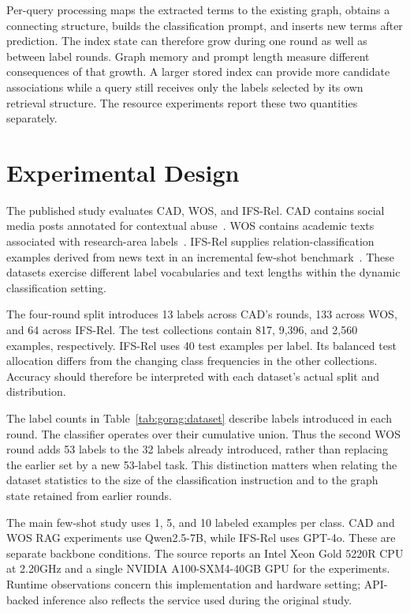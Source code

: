 Per-query processing maps the extracted terms to the existing graph, obtains a connecting structure, builds the classification prompt, and inserts new terms after prediction. The index state can therefore grow during one round as well as between label rounds. Graph memory and prompt length measure different consequences of that growth. A larger stored index can provide more candidate associations while a query still receives only the labels selected by its own retrieval structure. The resource experiments report these two quantities separately.

\section{Experimental Design}
\label{sec:gorag:experiments}

The published study evaluates CAD, WOS, and IFS-Rel. CAD contains social media posts annotated for contextual abuse~\cite{gorag-vidgen2021introducing}. WOS contains academic texts associated with research-area labels~\cite{gorag-kowsari2017hdltex}. IFS-Rel supplies relation-classification examples derived from news text in an incremental few-shot benchmark~\cite{gorag-xia-etal-2021-incremental}. These datasets exercise different label vocabularies and text lengths within the dynamic classification setting.

The four-round split introduces 13 labels across CAD's rounds, 133 across WOS, and 64 across IFS-Rel. The test collections contain 817, 9,396, and 2,560 examples, respectively. IFS-Rel uses 40 test examples per label. Its balanced test allocation differs from the changing class frequencies in the other collections. Accuracy should therefore be interpreted with each dataset's actual split and distribution.



The label counts in Table~\ref{tab:gorag:dataset} describe labels introduced in each round. The classifier operates over their cumulative union. Thus the second WOS round adds 53 labels to the 32 labels already introduced, rather than replacing the earlier set by a new 53-label task. This distinction matters when relating the dataset statistics to the size of the classification instruction and to the graph state retained from earlier rounds.

The main few-shot study uses 1, 5, and 10 labeled examples per class. CAD and WOS RAG experiments use Qwen2.5-7B, while IFS-Rel uses GPT-4o. These are separate backbone conditions. The source reports an Intel Xeon Gold 5220R CPU at 2.20GHz and a single NVIDIA A100-SXM4-40GB GPU for the experiments. Runtime observations concern this implementation and hardware setting; API-backed inference also reflects the service used during the original study.

